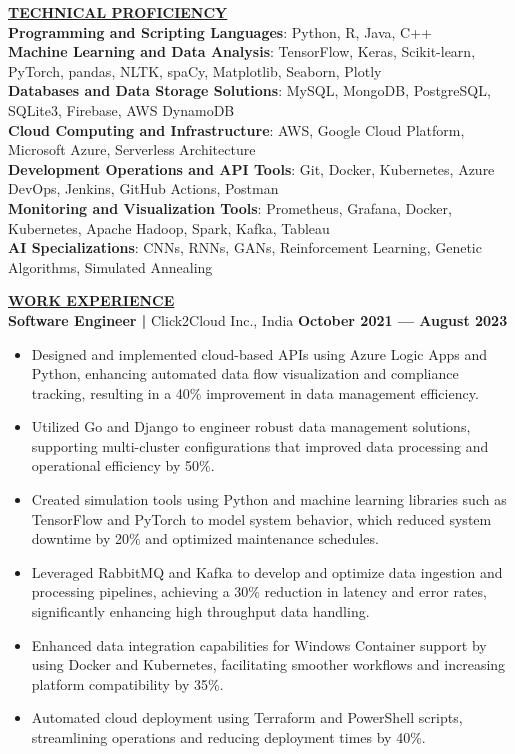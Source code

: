 \documentclass{article}
\begin{document}
\noindent \textbf{\underline{TECHNICAL PROFICIENCY}} \\
\textbf{Programming and Scripting Languages}{: \small Python, R, Java, C++} \\
\textbf{Machine Learning and Data Analysis}{: \small TensorFlow, Keras, Scikit-learn, PyTorch, pandas, NLTK, spaCy, Matplotlib, Seaborn, Plotly} \\
\textbf{Databases and Data Storage Solutions}{: \small MySQL, MongoDB, PostgreSQL, SQLite3, Firebase, AWS DynamoDB} \\
\textbf{Cloud Computing and Infrastructure}{: \small AWS, Google Cloud Platform, Microsoft Azure, Serverless Architecture} \\
\textbf{Development Operations and API Tools}{: \small Git, Docker, Kubernetes, Azure DevOps, Jenkins, GitHub Actions, Postman} \\
\textbf{Monitoring and Visualization Tools}{: \small Prometheus, Grafana, Docker, Kubernetes, Apache Hadoop, Spark, Kafka, Tableau} \\
\textbf{AI Specializations}{: \small CNNs, RNNs, GANs, Reinforcement Learning, Genetic Algorithms, Simulated Annealing} 

\vspace{2mm} 

\noindent \textbf{\underline{WORK EXPERIENCE}} \\
\noindent \textbf{Software Engineer | } Click2Cloud Inc., India \hfill \textbf{October 2021 — August 2023}
\begin{itemize}[noitemsep,nolistsep,leftmargin=*]
\item {\small Designed and implemented cloud-based APIs using Azure Logic Apps and Python, enhancing automated data flow visualization and compliance tracking, resulting in a 40\% improvement in data management efficiency.}
\item {\small Utilized Go and Django to engineer robust data management solutions, supporting multi-cluster configurations that improved data processing and operational efficiency by 50\%.}
\item {\small Created simulation tools using Python and machine learning libraries such as TensorFlow and PyTorch to model system behavior, which reduced system downtime by 20\% and optimized maintenance schedules.}
\item {\small Leveraged RabbitMQ and Kafka to develop and optimize data ingestion and processing pipelines, achieving a 30\% reduction in latency and error rates, significantly enhancing high throughput data handling.}
\item {\small Enhanced data integration capabilities for Windows Container support by using Docker and Kubernetes, facilitating smoother workflows and increasing platform compatibility by 35\%.}
\item {\small Automated cloud deployment using Terraform and PowerShell scripts, streamlining operations and reducing deployment times by 40\%.}
\end{itemize}
\end{document}
